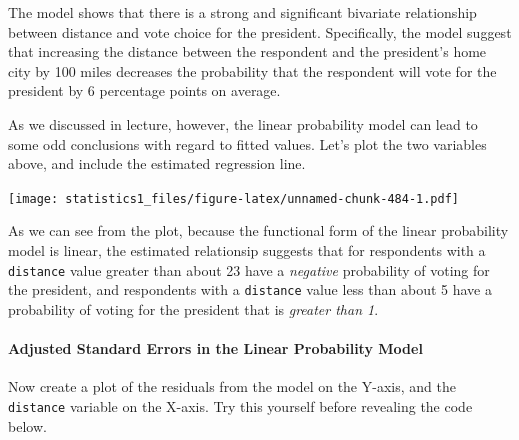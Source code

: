 \documentclass[]{article}
\newenvironment{Shaded}{\begin{snugshade}}{\end{snugshade}}
\newcommand{\KeywordTok}[1]{\textcolor[rgb]{0.13,0.29,0.53}{\textbf{#1}}}
\newcommand{\DataTypeTok}[1]{\textcolor[rgb]{0.13,0.29,0.53}{#1}}
\newcommand{\DecValTok}[1]{\textcolor[rgb]{0.00,0.00,0.81}{#1}}
\newcommand{\FloatTok}[1]{\textcolor[rgb]{0.00,0.00,0.81}{#1}}
\newcommand{\StringTok}[1]{\textcolor[rgb]{0.31,0.60,0.02}{#1}}
\newcommand{\OperatorTok}[1]{\textcolor[rgb]{0.81,0.36,0.00}{\textbf{#1}}}
\newcommand{\NormalTok}[1]{#1}
\let\oldparagraph\paragraph
\renewcommand{\paragraph}[1]{\oldparagraph{#1}\mbox{}}
\theoremstyle{definition}
\theoremstyle{definition}
\theoremstyle{definition}
\theoremstyle{remark}
\begin{document}
The model shows that there is a strong and significant bivariate
relationship between distance and vote choice for the president.
Specifically, the model suggest that increasing the distance between the
respondent and the president's home city by 100 miles decreases the
probability that the respondent will vote for the president by 6
percentage points on average.

As we discussed in lecture, however, the linear probability model can
lead to some odd conclusions with regard to fitted values. Let's plot
the two variables above, and include the estimated regression line.

\begin{Shaded}
\end{Shaded}

\texttt{[image: statistics1\_files/figure-latex/unnamed-chunk-484-1.pdf]}

As we can see from the plot, because the functional form of the linear
probability model is linear, the estimated relationsip suggests that for
respondents with a \texttt{distance} value greater than about 23 have a
\emph{negative} probability of voting for the president, and respondents
with a \texttt{distance} value less than about 5 have a probability of
voting for the president that is \emph{greater than 1}.

\paragraph{Adjusted Standard Errors in the Linear Probability
Model}\label{adjusted-standard-errors-in-the-linear-probability-model}

Now create a plot of the residuals from the model on the Y-axis, and the
\texttt{distance} variable on the X-axis. Try this yourself before
revealing the code below.
\end{document}
